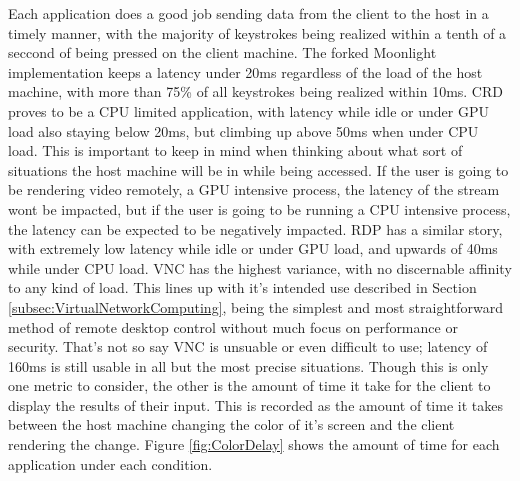 Each application does a good job sending data from the client to the host in a timely manner, with the majority of keystrokes being realized within a tenth of a seccond of being pressed on the client machine.
The forked Moonlight implementation keeps a latency under 20ms regardless of the load of the host machine, with more than 75\% of all keystrokes being realized within 10ms.
CRD proves to be a CPU limited application, with latency while idle or under GPU load also staying below 20ms, but climbing up above 50ms when under CPU load.
This is important to keep in mind when thinking about what sort of situations the host machine will be in while being accessed.
If the user is going to be rendering video remotely, a GPU intensive process, the latency of the stream wont be impacted, but if the user is going to be running a CPU intensive process, the latency can be expected to be negatively impacted.
RDP has a similar story, with extremely low latency while idle or under GPU load, and upwards of 40ms while under CPU load.
VNC has the highest variance, with no discernable affinity to any kind of load.
This lines up with it's intended use described in Section \ref{subsec:VirtualNetworkComputing}, being the simplest and most straightforward method of remote desktop control without much focus on performance or security.
That's not so say VNC is unsuable or even difficult to use; latency of 160ms is still usable in all but the most precise situations.
Though this is only one metric to consider, the other is the amount of time it take for the client to display the results of their input.
This is recorded as the amount of time it takes between the host machine changing the color of it's screen and the client rendering the change.
Figure \ref{fig:ColorDelay} shows the amount of time for each application under each condition.

